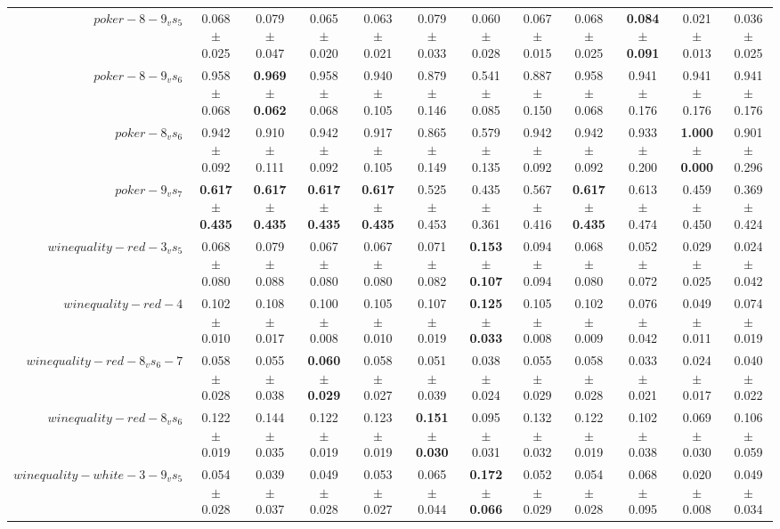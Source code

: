 \begin{table}[!ht]
{\begin{tabular}{r c c c c c c c c c c c}
$poker-8-9_vs_5$ & 0.068 $\pm$ 0.025 & 0.079 $\pm$ 0.047 & 0.065 $\pm$ 0.020 & 0.063 $\pm$ 0.021 & 0.079 $\pm$ 0.033 & 0.060 $\pm$ 0.028 & 0.067 $\pm$ 0.015 & 0.068 $\pm$ 0.025 & \textbf{0.084 $\pm$ 0.091} & 0.021 $\pm$ 0.013 & 0.036 $\pm$ 0.025 \\
$poker-8-9_vs_6$ & 0.958 $\pm$ 0.068 & \textbf{0.969 $\pm$ 0.062} & 0.958 $\pm$ 0.068 & 0.940 $\pm$ 0.105 & 0.879 $\pm$ 0.146 & 0.541 $\pm$ 0.085 & 0.887 $\pm$ 0.150 & 0.958 $\pm$ 0.068 & 0.941 $\pm$ 0.176 & 0.941 $\pm$ 0.176 & 0.941 $\pm$ 0.176 \\
$poker-8_vs_6$ & 0.942 $\pm$ 0.092 & 0.910 $\pm$ 0.111 & 0.942 $\pm$ 0.092 & 0.917 $\pm$ 0.105 & 0.865 $\pm$ 0.149 & 0.579 $\pm$ 0.135 & 0.942 $\pm$ 0.092 & 0.942 $\pm$ 0.092 & 0.933 $\pm$ 0.200 & \textbf{1.000 $\pm$ 0.000} & 0.901 $\pm$ 0.296 \\
$poker-9_vs_7$ & \textbf{0.617 $\pm$ 0.435} & \textbf{0.617 $\pm$ 0.435} & \textbf{0.617 $\pm$ 0.435} & \textbf{0.617 $\pm$ 0.435} & 0.525 $\pm$ 0.453 & 0.435 $\pm$ 0.361 & 0.567 $\pm$ 0.416 & \textbf{0.617 $\pm$ 0.435} & 0.613 $\pm$ 0.474 & 0.459 $\pm$ 0.450 & 0.369 $\pm$ 0.424 \\
$winequality-red-3_vs_5$ & 0.068 $\pm$ 0.080 & 0.079 $\pm$ 0.088 & 0.067 $\pm$ 0.080 & 0.067 $\pm$ 0.080 & 0.071 $\pm$ 0.082 & \textbf{0.153 $\pm$ 0.107} & 0.094 $\pm$ 0.094 & 0.068 $\pm$ 0.080 & 0.052 $\pm$ 0.072 & 0.029 $\pm$ 0.025 & 0.024 $\pm$ 0.042 \\
$winequality-red-4$ & 0.102 $\pm$ 0.010 & 0.108 $\pm$ 0.017 & 0.100 $\pm$ 0.008 & 0.105 $\pm$ 0.010 & 0.107 $\pm$ 0.019 & \textbf{0.125 $\pm$ 0.033} & 0.105 $\pm$ 0.008 & 0.102 $\pm$ 0.009 & 0.076 $\pm$ 0.042 & 0.049 $\pm$ 0.011 & 0.074 $\pm$ 0.019 \\
$winequality-red-8_vs_6-7$ & 0.058 $\pm$ 0.028 & 0.055 $\pm$ 0.038 & \textbf{0.060 $\pm$ 0.029} & 0.058 $\pm$ 0.027 & 0.051 $\pm$ 0.039 & 0.038 $\pm$ 0.024 & 0.055 $\pm$ 0.029 & 0.058 $\pm$ 0.028 & 0.033 $\pm$ 0.021 & 0.024 $\pm$ 0.017 & 0.040 $\pm$ 0.022 \\
$winequality-red-8_vs_6$ & 0.122 $\pm$ 0.019 & 0.144 $\pm$ 0.035 & 0.122 $\pm$ 0.019 & 0.123 $\pm$ 0.019 & \textbf{0.151 $\pm$ 0.030} & 0.095 $\pm$ 0.031 & 0.132 $\pm$ 0.032 & 0.122 $\pm$ 0.019 & 0.102 $\pm$ 0.038 & 0.069 $\pm$ 0.030 & 0.106 $\pm$ 0.059 \\
$winequality-white-3-9_vs_5$ & 0.054 $\pm$ 0.028 & 0.039 $\pm$ 0.037 & 0.049 $\pm$ 0.028 & 0.053 $\pm$ 0.027 & 0.065 $\pm$ 0.044 & \textbf{0.172 $\pm$ 0.066} & 0.052 $\pm$ 0.029 & 0.054 $\pm$ 0.028 & 0.068 $\pm$ 0.095 & 0.020 $\pm$ 0.008 & 0.049 $\pm$ 0.034 \\

\end{tabular}}
\end{table}

